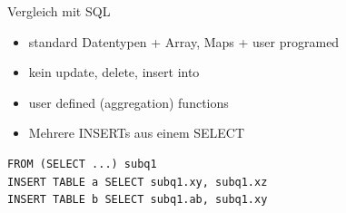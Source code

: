 \documentclass{beamer}
\begin{document}
\begin{frame}[fragile]{Vergleich mit SQL}
  \begin{itemize}
    \item standard Datentypen + Array, Maps + user programed
    \item kein update, delete, insert into
    \item user defined (aggregation) functions
    \item Mehrere INSERTs aus einem SELECT
  \end{itemize}
\pause
\begin{verbatim}
FROM (SELECT ...) subq1
INSERT TABLE a SELECT subq1.xy, subq1.xz
INSERT TABLE b SELECT subq1.ab, subq1.xy
\end{verbatim}
\end{frame}
\end{document}
